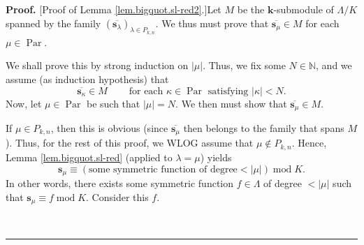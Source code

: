 \documentclass[numbers=enddot,12pt,final,onecolumn,notitlepage]{scrartcl}%
\theoremstyle{definition}
\newenvironment{proof}[1][Proof]{\noindent\textbf{#1.} }{\ \rule{0.5em}{0.5em}}
\begin{document}
\begin{proof}
[Proof of Lemma \ref{lem.bigquot.sl-red2}.]Let $M$ be the $\mathbf{k}%
$-submodule of $\Lambda/K$ spanned by the family $\left(  \overline
{\mathbf{s}_{\lambda}}\right)  _{\lambda\in P_{k,n}}$. We thus must prove that
$\overline{\mathbf{s}_{\mu}}\in M$ for each $\mu\in\operatorname*{Par}$.

We shall prove this by strong induction on $\left\vert \mu\right\vert $. Thus,
we fix some $N\in\mathbb{N}$, and we assume (as induction hypothesis) that
\begin{equation}
\overline{\mathbf{s}_{\kappa}}\in M\ \ \ \ \ \ \ \ \ \ \text{for each }%
\kappa\in\operatorname*{Par}\text{ satisfying }\left\vert \kappa\right\vert
<N. \label{pf.lem.bigquot.sl-red2.IH}%
\end{equation}
Now, let $\mu\in\operatorname*{Par}$ be such that $\left\vert \mu\right\vert
=N$. We then must show that $\overline{\mathbf{s}_{\mu}}\in M$.

If $\mu\in P_{k,n}$, then this is obvious (since $\overline{\mathbf{s}_{\mu}}$
then belongs to the family that spans $M$). Thus, for the rest of this proof,
we WLOG assume that $\mu\notin P_{k,n}$. Hence, Lemma \ref{lem.bigquot.sl-red}
(applied to $\lambda=\mu$) yields%
\[
\mathbf{s}_{\mu}\equiv\left(  \text{some symmetric function of degree
}<\left\vert \mu\right\vert \right)  \operatorname{mod}K.
\]
In other words, there exists some symmetric function $f\in\Lambda$ of degree
$<\left\vert \mu\right\vert $ such that $\mathbf{s}_{\mu}\equiv
f\operatorname{mod}K$. Consider this $f$.


\end{proof}
\end{document}
